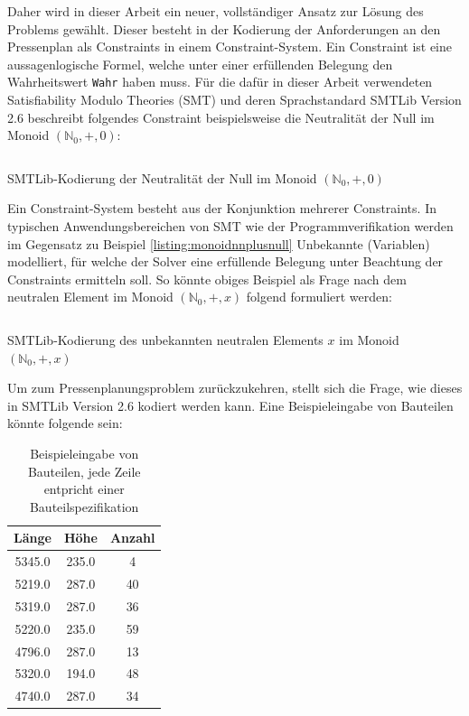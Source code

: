 Daher wird in dieser Arbeit ein neuer, vollständiger Ansatz zur Lösung des Problems gewählt.
Dieser besteht in der Kodierung der Anforderungen an den Pressenplan als Constraints in einem Constraint-System.
Ein Constraint ist eine aussagenlogische Formel, welche unter einer erfüllenden Belegung den Wahrheitswert \texttt{Wahr} haben muss.
Für die dafür in dieser Arbeit verwendeten Satisfiability Modulo Theories (SMT) und deren Sprachstandard SMTLib Version 2.6 \cite{smtlib}
beschreibt folgendes Constraint beispielsweise die Neutralität der Null im Monoid $(\mathbb{N}_0, +, 0)$:

\begin{listing}[H]
    \inputminted{haskell}{Code/Einleitung/MonoidNPlusNull.smt2}
    \caption{SMTLib-Kodierung der Neutralität der Null im Monoid $(\mathbb{N}_0, +, 0)$}
    \label{listing:monoidnnplusnull}
\end{listing}

Ein Constraint-System besteht aus der Konjunktion mehrerer Constraints.
In typischen Anwendungsbereichen von SMT wie der Programmverifikation \cite{smt} werden im Gegensatz zu Beispiel \ref{listing:monoidnnplusnull}
Unbekannte (Variablen) modelliert, für welche der Solver eine erfüllende Belegung unter Beachtung der Constraints ermitteln soll.
So könnte obiges Beispiel als Frage nach dem neutralen Element im Monoid $(\mathbb{N}_0, +, x)$ folgend formuliert werden:

\begin{listing}[H]
    \inputminted{haskell}{Code/Einleitung/MonoidNPlusZ.smt2}
    \caption{SMTLib-Kodierung des unbekannten neutralen Elements $x$ im Monoid $(\mathbb{N}_0, +, x)$}
    \label{listing:monoidnnplusz}
\end{listing}

Um zum Pressenplanungsproblem zurückzukehren, stellt sich die Frage, wie dieses in SMTLib Version 2.6 kodiert werden kann.
Eine Beispieleingabe von Bauteilen könnte folgende sein:

\begin{table}[H]
    \centering
    \begin{tabular}{|c|c|c|}
        \hline
        \textbf{Länge} & \textbf{Höhe} & \textbf{Anzahl} \\
        \hline
        5345.0 & 235.0 & 4 \\
        5219.0 & 287.0 & 40 \\
        5319.0 & 287.0 & 36 \\
        5220.0 & 235.0 & 59 \\
        4796.0 & 287.0 & 13 \\
        5320.0 & 194.0 & 48 \\
        4740.0 & 287.0 & 34 \\
        \hline
    \end{tabular}
    \caption{Beispieleingabe von Bauteilen, jede Zeile entpricht einer Bauteilspezifikation}
    \label{table:bauteileingabe}
\end{table}

